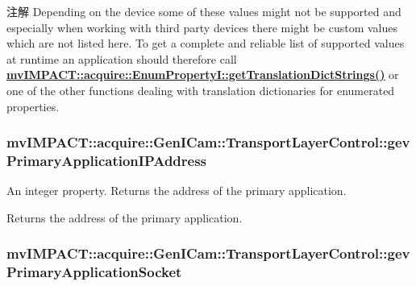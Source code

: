 \begin{DoxyNote}{注解}
Depending on the device some of these values might not be supported and especially when working with third party devices there might be custom values which are not listed here. To get a complete and reliable list of supported values at runtime an application should therefore call {\bfseries \hyperlink{classmv_i_m_p_a_c_t_1_1acquire_1_1_enum_property_i_a0ba6ccbf5ee69784d5d0b537924d26b6}{mv\+I\+M\+P\+A\+C\+T\+::acquire\+::\+Enum\+Property\+I\+::get\+Translation\+Dict\+Strings()}} or one of the other functions dealing with translation dictionaries for enumerated properties. 
\end{DoxyNote}
\hypertarget{classmv_i_m_p_a_c_t_1_1acquire_1_1_gen_i_cam_1_1_transport_layer_control_a42fe0955f1b5a223d9e904e2fcf341b2}{
\subsubsection[{gev\+Primary\+Application\+I\+P\+Address}]{ mv\+I\+M\+P\+A\+C\+T\+::acquire\+::\+Gen\+I\+Cam\+::\+Transport\+Layer\+Control\+::gev\+Primary\+Application\+I\+P\+Address}}\label{classmv_i_m_p_a_c_t_1_1acquire_1_1_gen_i_cam_1_1_transport_layer_control_a42fe0955f1b5a223d9e904e2fcf341b2}


An integer property. Returns the address of the primary application. 

Returns the address of the primary application. \hypertarget{classmv_i_m_p_a_c_t_1_1acquire_1_1_gen_i_cam_1_1_transport_layer_control_ab1741fd99ef294ac244e8e9fe7acdfbb}{
\subsubsection[{gev\+Primary\+Application\+Socket}]{ mv\+I\+M\+P\+A\+C\+T\+::acquire\+::\+Gen\+I\+Cam\+::\+Transport\+Layer\+Control\+::gev\+Primary\+Application\+Socket}}\label{classmv_i_m_p_a_c_t_1_1acquire_1_1_gen_i_cam_1_1_transport_layer_control_ab1741fd99ef294ac244e8e9fe7acdfbb}


